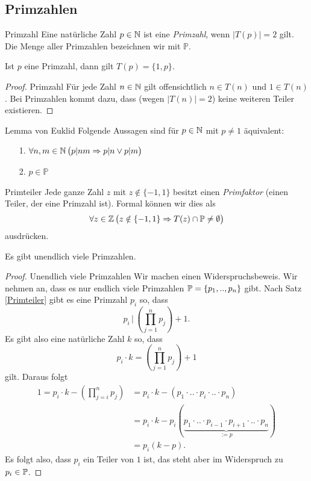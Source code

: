 \subsection{Primzahlen}

\begin{definition}{Primzahl}
Eine natürliche Zahl $p\in\N$ ist eine \textit{Primzahl}, wenn $|T(p)|=2$ gilt. Die Menge aller Primzahlen bezeichnen wir mit $\mathbb{P}$.
\end{definition}

\begin{remark}
Ist $p$ eine Primzahl, dann gilt $T(p)=\{1,p\}$.
\end{remark}
\begin{proof}{Primzahl}
Für jede Zahl $n\in\N$ gilt offensichtlich $n\in T(n)$ und $1\in T(n)$. Bei Primzahlen kommt dazu, dass (wegen $|T(n)|=2$) keine weiteren Teiler existieren.
\end{proof}

\begin{lemma}{Lemma von Euklid}
Folgende Aussagen sind für $p\in\N$ mit $p\neq 1$ äquivalent:
\begin{enumerate}
\item[1.] $\forall n,m\in\N\,\big(p|nm\Rightarrow p|n\vee p|m\big)$
\item[2.] $p\in\mathbb{P}$
\end{enumerate}
\end{lemma}


\begin{lemma}{Primteiler}
 Jede ganze Zahl $z$ mit $z\notin\{-1,1\}$ besitzt einen \textit{Primfaktor} (einen Teiler, der eine Primzahl ist). Formal können wir dies als
\[
\forall z\in\Z\,\big(z\notin\{-1,1\}\Rightarrow T(z)\cap\P\neq\emptyset\big)
\]
ausdrücken.
\end{lemma}


\begin{theorem}{}
 Es gibt unendlich viele Primzahlen.
\end{theorem}
\begin{proof}{Unendlich viele Primzahlen}
Wir machen einen Widerspruchsbeweis. Wir nehmen an, dass es nur endlich viele Primzahlen $\P=\{p_1,..,p_n\}$ gibt. Nach Satz \ref{Primteiler} gibt es eine Primzahl $p_i$ so, dass
 \[
  p_i\,|\,(\prod_{j=1}^np_j)+1.
 \]
Es gibt also eine natürliche Zahl $k$ so, dass
\[
 p_i\cdot k=(\prod_{j=1}^np_j)+1
\]
gilt. Daraus folgt
\begin{align*}
 1=p_i\cdot k-(\prod_{j=i}^np_j)&=p_i\cdot k-(p_1\cdot..\cdot p_i\cdot..\cdot p_n)\\
&=p_i\cdot k-p_i(\underbrace{p_1\cdot..\cdot p_{i-1}\cdot p_{i+1}\cdot..\cdot p_n}_{:=p})\\
&=p_i(k-p).
\end{align*}
Es folgt also, dass $p_i$ ein Teiler von $1$ ist, das steht aber im Widerspruch zu $p_i\in\P$.
\end{proof}

